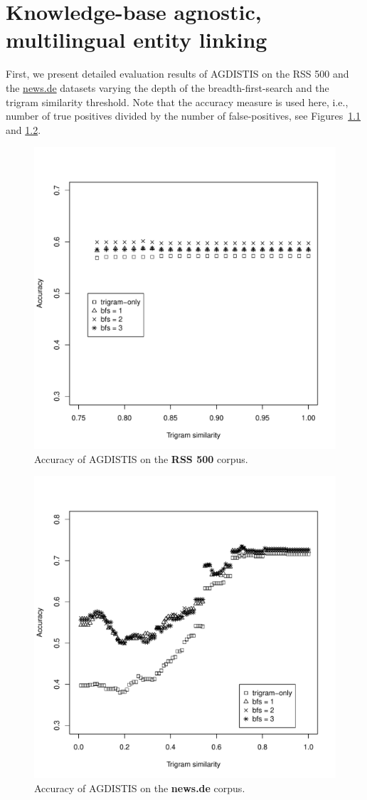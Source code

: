 \chapter{Knowledge-base agnostic, multilingual entity linking}
\label{cha:app_agdistis}

First, we present detailed evaluation results of AGDISTIS on the RSS 500 and the \url{news.de} datasets varying the depth of the breadth-first-search and the trigram similarity threshold. Note that the accuracy measure is used here, i.e., number of true positives divided by the number of false-positives, see Figures~\ref{fig:RSS500} and \ref{fig:german}.

\begin{figure}[htb!]   
    \centering
        \includegraphics[width=0.55\linewidth]{Appendix/fig/500news.pdf}
       \caption{Accuracy of AGDISTIS on the \textbf{RSS 500} corpus.}\label{fig:RSS500}
\end{figure}
\begin{figure}[htb!]   
    \centering  
         \includegraphics[width=0.55\linewidth]{Appendix/fig/german.pdf}
    \caption{Accuracy of AGDISTIS on the \textbf{news.de} corpus.}\label{fig:german} 
\end{figure}

